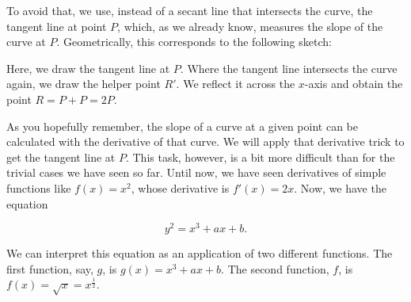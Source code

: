 \documentclass[tikz]{scrreprt}
\begin{document}
To avoid that, we use, instead of a secant line
that intersects the curve, the tangent line at
point $P$, which, as we already know, measures 
the slope of the curve at $P$.
Geometrically, this corresponds to the following sketch:

\begin{center}
\end{center}

Here, we draw the tangent line at $P$.
Where the tangent line intersects the curve again,
we draw the helper point $R'$. We reflect it across
the $x$-axis and obtain the point $R = P+P = 2P$.

As you hopefully remember, the slope of a curve 
at a given point can be calculated with the derivative of that curve.
We will apply that derivative trick to get the tangent line
at $P$. This task, however, is a bit more difficult than
for the trivial cases we have seen so far.
Until now, we have seen derivatives of simple functions like
$f(x) = x^2$, whose derivative is $f'(x) = 2x$.
Now, we have the equation

\begin{equation}
y^2 = x^3 + ax + b.
\end{equation}

We can interpret this equation as an application of
two different functions. The first function, say, $g$,
is $g(x) = x^3 + ax + b$. The second function, $f$, is
$f(x) = \sqrt{x} = x^{\frac{1}{2}}$.
\end{document}
